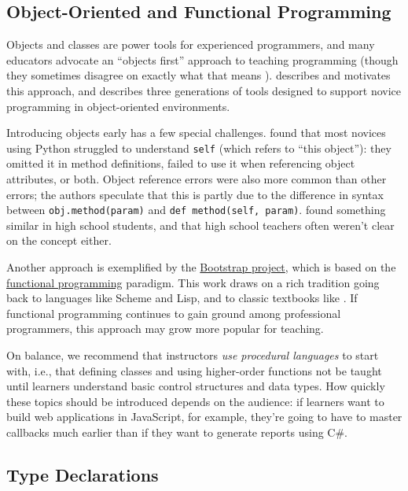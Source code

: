 \subsection{Object-Oriented and Functional Programming}\label{object-oriented-and-functional-programming}

Objects and classes are power tools for experienced programmers, and
many educators advocate an ``objects first'' approach to teaching
programming (though they sometimes disagree on exactly what that means
\cite{Benn2007b}). \cite{Sorv2014} describes and motivates this
approach, and \cite{Koll2015} describes three generations of tools
designed to support novice programming in object-oriented environments.

Introducing objects early has a few special challenges.
\cite{Mill2016b} found that most novices using Python struggled to
understand \texttt{self} (which refers to ``this object''): they omitted it in
method definitions, failed to use it when referencing object attributes,
or both. Object reference errors were also more common than other
errors; the authors speculate that this is partly due to the difference
in syntax between \texttt{obj.method(param)} and \texttt{def\ method(self,\ param)}.
\cite{Rago2017} found something similar in high school students, and
that high school teachers often weren't clear on the concept either.

Another approach is exemplified by the \href{http://www.bootstrapworld.org/}{Bootstrap project},
which is based on the \protect\hyperlink{g:functional-programming}{functional
programming} paradigm. This work draws on a
rich tradition going back to languages like Scheme and Lisp, and to
classic textbooks like
\cite{Fell2001,Frie1995,Abel1996}. If functional
programming continues to gain ground among professional programmers,
this approach may grow more popular for teaching.

On balance, we recommend that instructors \emph{use procedural languages} to
start with, i.e., that defining classes and using higher-order functions
not be taught until learners understand basic control structures and
data types. How quickly these topics should be introduced depends on the
audience: if learners want to build web applications in JavaScript, for
example, they're going to have to master callbacks much earlier than if
they want to generate reports using C\#.

\subsection{Type Declarations}\label{type-declarations}

